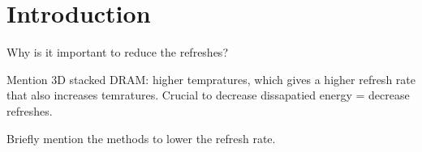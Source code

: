 \section{Introduction}
\label{sec:int}
Why is it important to reduce the refreshes?

Mention 3D stacked DRAM: higher tempratures, which gives a higher refresh rate that also increases temratures. Crucial to decrease dissapatied energy = decrease refreshes.

Briefly mention the methods to lower the refresh rate.